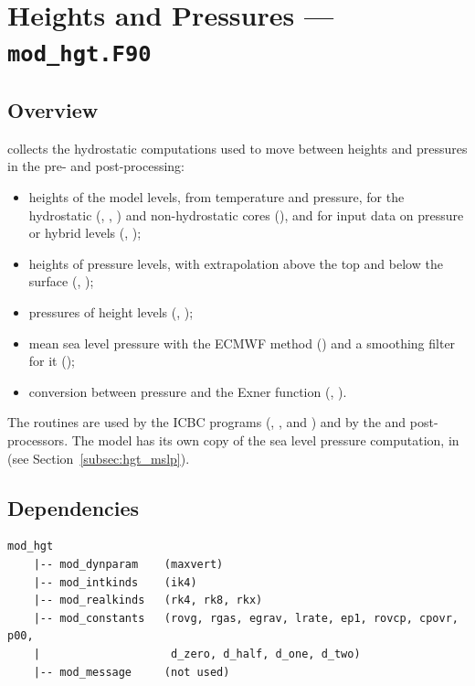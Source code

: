 \section{Heights and Pressures --- \texttt{mod\_hgt.F90}}
\label{sec:hgt}

\subsection{Overview}

 collects the hydrostatic computations used to move between
heights and pressures in the pre- and post-processing:

\begin{itemize}
  \item heights of the model levels, from temperature and pressure, for the
        hydrostatic (, , ) and
        non-hydrostatic cores (), and for input data on
        pressure or hybrid levels (, );
  \item heights of pressure levels, with extrapolation above the top and
        below the surface (, );
  \item pressures of height levels (, );
  \item mean sea level pressure with the ECMWF method () and a
        smoothing filter for it ();
  \item conversion between pressure and the Exner function (,
        ).
\end{itemize}

The routines are used by the ICBC programs (,
,  and ) and by the
 and  post-processors. The model has its own
copy of the sea level pressure computation, in 
(see Section~\ref{subsec:hgt_mslp}).

\subsection{Dependencies}

\begin{lstlisting}
mod_hgt
    |-- mod_dynparam    (maxvert)
    |-- mod_intkinds    (ik4)
    |-- mod_realkinds   (rk4, rk8, rkx)
    |-- mod_constants   (rovg, rgas, egrav, lrate, ep1, rovcp, cpovr, p00,
    |                    d_zero, d_half, d_one, d_two)
    |-- mod_message     (not used)
\end{lstlisting}

